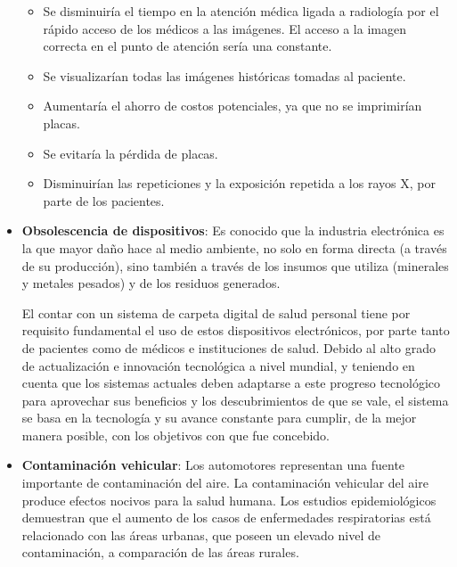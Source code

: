 \begin{itemize}
    \begin{itemize}
        \item Se disminuiría el tiempo en la atención médica ligada a radiología por el rápido acceso de los médicos a las imágenes.
        El acceso a la imagen correcta en el punto de atención sería una constante.
        
        \item Se visualizarían todas las imágenes históricas tomadas al paciente.
        
        \item Aumentaría el ahorro de costos potenciales, ya que no se imprimirían placas.
        
        \item Se evitaría la pérdida de placas.
        
        \item Disminuirían las repeticiones y la exposición repetida a los rayos X, por parte de los pacientes.
    \end{itemize}
    
    
    \item \textbf{Obsolescencia de dispositivos}:
    Es conocido que la industria electrónica es la que mayor daño hace al medio ambiente, no solo en forma directa (a través de su producción), sino también a través de los insumos que utiliza (minerales y metales pesados) y de los residuos generados.
    
    El contar con un sistema de carpeta digital de salud personal tiene por requisito fundamental el uso de estos dispositivos electrónicos, por parte tanto de pacientes como de médicos e instituciones de salud.
    Debido al alto grado de actualización e innovación tecnológica a nivel mundial, y teniendo en cuenta que los sistemas actuales deben adaptarse a este progreso tecnológico para aprovechar sus beneficios y los descubrimientos de que se vale, el sistema se basa en la tecnología y su avance constante para cumplir, de la mejor manera posible, con los objetivos con que fue concebido.
    
    
    \item \textbf{Contaminación vehicular}:
    Los automotores representan una fuente importante de contaminación del aire.
    La contaminación vehicular del aire produce efectos nocivos para la salud humana.
    Los estudios epidemiológicos demuestran que el aumento de los casos de enfermedades respiratorias está relacionado con las áreas urbanas, que poseen un elevado nivel de contaminación, a comparación de las áreas rurales.
    

\end{itemize}
